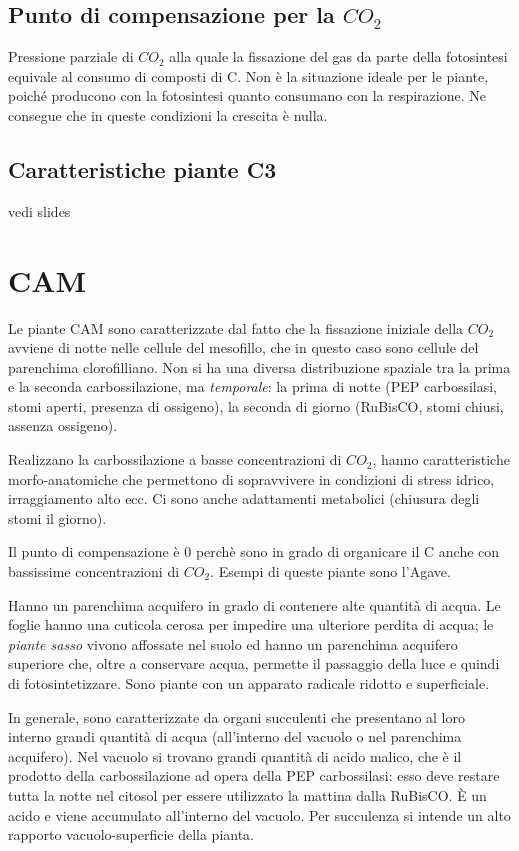 \documentclass[a4paper,12pt]{book}
\begin{document}
\subsection{Punto di compensazione per la $CO_{2}$}
Pressione parziale di $CO_{2}$ alla quale la fissazione del gas da parte della fotosintesi equivale al consumo di composti di C.
 Non è la
situazione ideale per le piante, poiché producono con la fotosintesi quanto consumano con la
respirazione. Ne consegue che in queste condizioni la crescita è nulla.
\subsection{Caratteristiche piante C3}
vedi slides

\section{CAM}
Le piante CAM sono caratterizzate dal fatto che la fissazione iniziale della $CO_{2}$ avviene di notte nelle cellule del mesofillo, che in questo caso sono cellule del parenchima clorofilliano. Non si ha una diversa distribuzione spaziale tra la prima e la seconda carbossilazione, ma \emph{temporale}: la prima di notte (PEP carbossilasi, stomi aperti, presenza di ossigeno), la seconda di giorno (RuBisCO, stomi chiusi, assenza ossigeno).

Realizzano la carbossilazione a basse concentrazioni di $CO_{2}$, hanno caratteristiche morfo-anatomiche che permettono di sopravvivere in condizioni di stress idrico, irraggiamento alto ecc. Ci sono anche adattamenti metabolici (chiusura degli stomi il giorno).
 
Il punto di compensazione è 0 perchè sono in grado di organicare il C anche con bassissime concentrazioni di $CO_{2}$. Esempi di queste piante sono l'Agave. 

Hanno un parenchima acquifero in grado di contenere alte quantità di acqua. Le foglie hanno una cuticola cerosa per impedire una ulteriore perdita di acqua; le \emph{piante sasso} vivono affossate nel suolo ed hanno un parenchima acquifero superiore che, oltre a conservare acqua, permette il passaggio della luce e quindi di fotosintetizzare.
Sono piante con un apparato radicale ridotto e superficiale.

In generale, sono caratterizzate da organi succulenti che presentano al loro interno grandi quantità di acqua (all'interno del vacuolo o nel parenchima acquifero). Nel vacuolo si trovano grandi quantità di acido malico, che è il prodotto della carbossilazione ad opera della PEP carbossilasi: esso deve restare tutta la notte nel citosol per essere utilizzato la mattina dalla RuBisCO. È un acido e viene accumulato all'interno del vacuolo. Per succulenza si intende un alto rapporto vacuolo-superficie della pianta.
\end{document}
